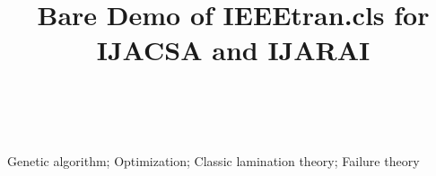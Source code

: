 \documentclass[conference, letterpaper]{IEEEtran}
\begin{document}
%
\title{Bare Demo of IEEEtran.cls for IJACSA and IJARAI}

\author{\\
}

\maketitle

\begin{abstract}
	
\end{abstract}

\begin{IEEEkeywords}
Genetic algorithm; Optimization; Classic lamination theory; Failure theory
\end{IEEEkeywords}


%
\IEEEpeerreviewmaketitle













\end{document}
